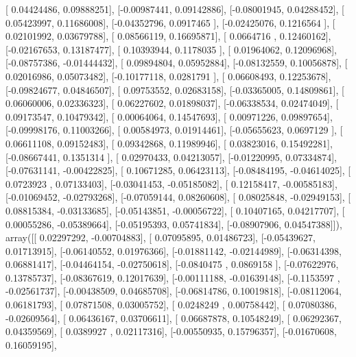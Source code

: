 \documentclass{article}
\begin{document}
       [ 0.04424486,  0.09888251],
       [-0.00987441,  0.09142886],
       [-0.08001945,  0.04288452],
       [ 0.05423997,  0.11686008],
       [-0.04352796,  0.0917465 ],
       [-0.02425076,  0.1216564 ],
       [ 0.02101992,  0.03679788],
       [ 0.08566119,  0.16695871],
       [ 0.0664716 ,  0.12460162],
       [-0.02167653,  0.13187477],
       [ 0.10393944,  0.1178035 ],
       [ 0.01964062,  0.12096968],
       [-0.08757386, -0.01444432],
       [ 0.09894804,  0.05952884],
       [-0.08132559,  0.10056878],
       [ 0.02016986,  0.05073482],
       [-0.10177118,  0.0281791 ],
       [ 0.06608493,  0.12253678],
       [-0.09824677,  0.04846507],
       [ 0.09753552,  0.02683158],
       [-0.03365005,  0.14809861],
       [ 0.06060006,  0.02336323],
       [ 0.06227602,  0.01898037],
       [-0.06338534,  0.02474049],
       [ 0.09173547,  0.10479342],
       [ 0.00064064,  0.14547693],
       [ 0.00971226,  0.09897654],
       [-0.09998176,  0.11003266],
       [ 0.00584973,  0.01914461],
       [-0.05655623,  0.0697129 ],
       [ 0.06611108,  0.09152483],
       [ 0.09342868,  0.11989946],
       [ 0.03823016,  0.15492281],
       [-0.08667441,  0.1351314 ],
       [ 0.02970433,  0.04213057],
       [-0.01220995,  0.07334874],
       [-0.07631141, -0.00422825],
       [ 0.10671285,  0.06423113],
       [-0.08484195, -0.04614025],
       [ 0.0723923 ,  0.07133403],
       [-0.03041453, -0.05185082],
       [ 0.12158417, -0.00585183],
       [-0.01069452, -0.02793268],
       [-0.07059144,  0.08260608],
       [ 0.08025848, -0.02949153],
       [ 0.08815384, -0.03133685],
       [-0.05143851, -0.00056722],
       [ 0.10407165,  0.04217707],
       [ 0.00055286, -0.05389664],
       [-0.05195393,  0.05741834],
       [-0.08907906,  0.04547388]]), array([[ 0.02297292, -0.00704883],
       [ 0.07095895,  0.01486723],
       [-0.05439627,  0.01713915],
       [-0.06140552,  0.01976366],
       [-0.01881142, -0.02144989],
       [-0.06314398,  0.06881417],
       [-0.04464154, -0.02750618],
       [-0.0840475 ,  0.0869158 ],
       [-0.07622976,  0.13785737],
       [-0.08367619,  0.12017639],
       [-0.00111188, -0.01639148],
       [-0.1153597 , -0.02561737],
       [-0.00438509,  0.04685708],
       [-0.06814786,  0.10019818],
       [-0.08112064,  0.06181793],
       [ 0.07871508,  0.03005752],
       [ 0.0248249 ,  0.00758442],
       [ 0.07080386, -0.02609564],
       [ 0.06436167,  0.03706611],
       [ 0.06687878,  0.10548249],
       [ 0.06292367,  0.04359569],
       [ 0.0389927 ,  0.02117316],
       [-0.00550935,  0.15796357],
       [-0.01670608,  0.16059195],
\end{document}
